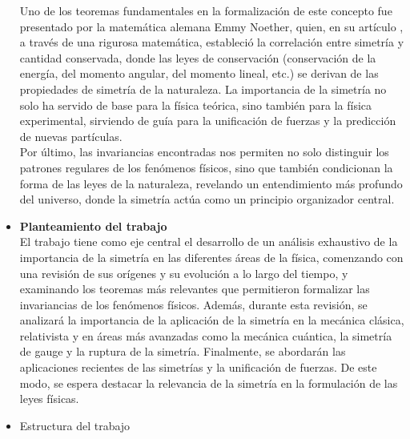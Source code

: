 \documentclass[11pt,a4paper,spanish]{book}
\begin{document}
\begin{itemize}
Uno de los teoremas fundamentales en la formalización de este concepto fue presentado por la matemática alemana Emmy Noether, quien, en su artículo \cite{noether1918}, a través de una rigurosa matemática, estableció la correlación entre simetría y cantidad conservada, donde las leyes de conservación (conservación de la energía, del momento angular, del momento lineal, etc.) se derivan de las propiedades de simetría de la naturaleza. La importancia de la simetría no solo ha servido de base para la física teórica, sino también para la física experimental, sirviendo de guía para la unificación de fuerzas y la predicción de nuevas partículas.\\
Por último, las invariancias encontradas nos permiten no solo distinguir los patrones regulares de los fenómenos físicos, sino que también condicionan la forma de las leyes de la naturaleza, revelando un entendimiento más profundo del universo, donde la simetría actúa como un principio organizador central.\\
\item \textbf{Planteamiento del trabajo}\\
El trabajo tiene como eje central el desarrollo de un análisis exhaustivo de la importancia de la simetría en las diferentes áreas de la física, comenzando con una revisión de sus orígenes y su evolución a lo largo del tiempo, y examinando los teoremas más relevantes que permitieron formalizar las invariancias de los fenómenos físicos. Además, durante esta revisión, se analizará la importancia de la aplicación de la simetría en la mecánica clásica, relativista y en áreas más avanzadas como la mecánica cuántica, la simetría de gauge y la ruptura de la simetría. Finalmente, se abordarán las aplicaciones recientes de las simetrías y la unificación de fuerzas. De este modo, se espera destacar la relevancia de la simetría en la formulación de las leyes físicas.\\
\item Estructura del trabajo
\end{itemize}
\vspace{2cm}
\end{document}
